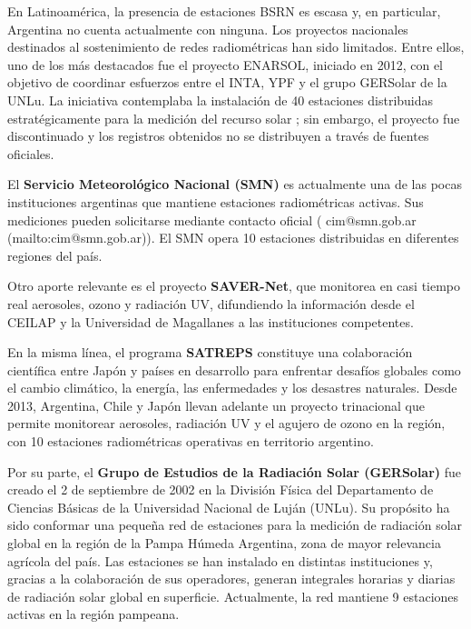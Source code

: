 \documentclass[letterpaper,12pt, twoside]{report}
\providecommand{\DIFdeltex}[1]{{\protect\color{red} \scriptsize #1}} %
\providecommand{\DIFdel}[1]{\texorpdfstring{\DIFdeltex{#1}}{}} %
\begin{document}
\DIFdel{En Latinoamérica, la presencia de estaciones BSRN es escasa y, en particular, Argentina no cuenta actualmente con ninguna. Los proyectos nacionales destinados al sostenimiento de redes radiométricas han sido limitados. Entre ellos, uno de los más destacados fue el proyecto ENARSOL, iniciado en 2012, con el objetivo de coordinar esfuerzos entre el INTA, YPF y el grupo GERSolar de la UNLu. La iniciativa contemplaba la instalación de 40 estaciones distribuidas estratégicamente para la medición del recurso solar \cite{aristegui2012}; sin embargo, el proyecto fue discontinuado y los registros obtenidos no se distribuyen a través de fuentes oficiales.}%

\DIFdel{El \textbf{Servicio Meteorológico Nacional (SMN)} es actualmente una de las pocas instituciones argentinas que mantiene estaciones radiométricas activas. Sus mediciones pueden solicitarse mediante contacto oficial (}%
\DIFdel{cim@smn.gob.ar}%
\DIFdel{(mailto:cim@smn.gob.ar)). El SMN opera 10 estaciones distribuidas en diferentes regiones del país.
}%

\DIFdel{Otro aporte relevante es el proyecto \textbf{SAVER-Net}, que monitorea en casi tiempo real aerosoles, ozono y radiación UV, difundiendo la información desde el CEILAP y la Universidad de Magallanes a las instituciones competentes.
}%

\DIFdel{En la misma línea, el programa \textbf{SATREPS} constituye una colaboración científica entre Japón y países en desarrollo para enfrentar desafíos globales como el cambio climático, la energía, las enfermedades y los desastres naturales. Desde 2013, Argentina, Chile y Japón llevan adelante un proyecto trinacional que permite monitorear aerosoles, radiación UV y el agujero de ozono en la región, con 10 estaciones radiométricas operativas en territorio argentino.}%

\DIFdel{Por su parte, el \textbf{Grupo de Estudios de la Radiación Solar (GERSolar)} fue creado el 2 de septiembre de 2002 en la División Física del Departamento de Ciencias Básicas de la Universidad Nacional de Luján (UNLu). Su propósito ha sido conformar una pequeña red de estaciones para la medición de radiación solar global en la región de la Pampa Húmeda Argentina, zona de mayor relevancia agrícola del país. Las estaciones se han instalado en distintas instituciones y, gracias a la colaboración de sus operadores, generan integrales horarias y diarias de radiación solar global en superficie. Actualmente, la red mantiene 9 estaciones activas en la región pampeana.}%
\end{document}
